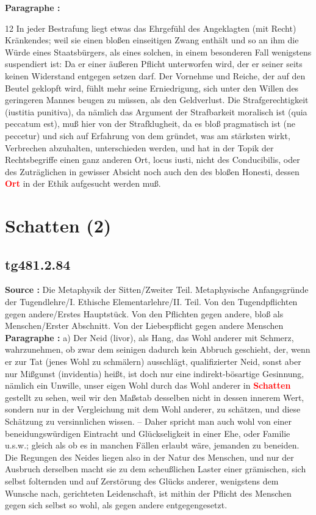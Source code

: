 \documentclass[a4paper,12pt,twoside]{book}
\newcommand{\match}[1]{\textcolor{red}{\textbf{#1}}}
\newcommand{\unnumberedsection}[1]{
	\section*{#1}
	\addcontentsline{toc}{section}{#1}
	\markright{#1}
}
\begin{document}
	\textbf{Paragraphe : }
	
	12 In jeder Bestrafung liegt etwas das Ehrgefühl des Angeklagten (mit Recht) Kränkendes; weil sie einen bloßen einseitigen Zwang enthält und so an ihm die Würde eines Staatsbürgers, als eines solchen, in einem besonderen Fall wenigstens suspendiert ist: Da er einer äußeren Pflicht unterworfen wird, der er seiner seits keinen Widerstand entgegen setzen darf. Der Vornehme und Reiche, der auf den Beutel geklopft wird, fühlt mehr seine Erniedrigung, sich unter den Willen des geringeren Mannes beugen zu müssen, als den Geldverlust. Die Strafgerechtigkeit (iustitia punitiva), da nämlich das Argument der Strafbarkeit moralisch ist (quia peccatum est), muß hier von der Strafklugheit, da es bloß pragmatisch ist (ne peccetur) und sich auf Erfahrung von dem gründet, was am stärksten wirkt, Verbrechen abzuhalten, unterschieden werden, und hat in der Topik der Rechtsbegriffe einen ganz anderen Ort, locus iusti, nicht des Conducibilis, oder des Zuträglichen in gewisser Absicht noch auch den des bloßen Honesti, dessen \match{Ort} in der Ethik aufgesucht werden muß. 
	
	\unnumberedsection{Schatten (2)} 
	\subsection*{tg481.2.84} 
	\textbf{Source : }Die Metaphysik der Sitten/Zweiter Teil. Metaphysische Anfangsgründe der Tugendlehre/I. Ethische Elementarlehre/II. Teil. Von den Tugendpflichten gegen andere/Erstes Hauptstück. Von den Pflichten gegen andere, bloß als Menschen/Erster Abschnitt. Von der Liebespflicht gegen andere Menschen\\  
	
	\textbf{Paragraphe : }a) Der Neid (livor), als Hang, das Wohl anderer mit Schmerz, wahrzunehmen, ob zwar dem seinigen dadurch kein Abbruch geschieht, der, wenn er zur Tat (jenes Wohl zu schmälern) ausschlägt, qualifizierter Neid, sonst aber nur Mißgunst (invidentia) heißt, ist doch nur eine indirekt-bösartige Gesinnung, nämlich ein Unwille, unser eigen Wohl durch das Wohl anderer in \match{Schatten} gestellt zu sehen, weil wir den Maßstab desselben nicht in dessen innerem Wert, sondern nur in der Vergleichung mit dem Wohl anderer, zu schätzen, und diese Schätzung zu versinnlichen wissen. – Daher spricht man auch wohl von einer beneidungswürdigen Eintracht und Glückseligkeit in einer Ehe, oder Familie u.s.w.; gleich als ob es in manchen Fällen erlaubt wäre, jemanden zu beneiden. Die Regungen des Neides liegen also in der Natur des Menschen, und nur der Ausbruch derselben macht sie zu dem scheußlichen Laster einer grämischen, sich selbst folternden und auf Zerstörung des Glücks anderer, wenigstens dem Wunsche nach, gerichteten Leidenschaft, ist mithin der Pflicht des Menschen gegen sich selbst so wohl, als gegen andere entgegengesetzt. 
	
\end{document}
